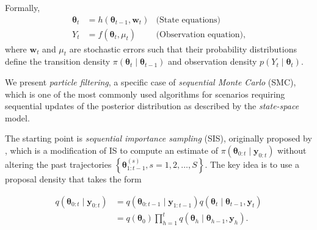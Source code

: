 Formally,
\begin{align*}
	\bm{\theta}_t &= h(\bm{\theta}_{t-1}, \bm{w}_t) & \text{(State equations)}\nonumber\\
	Y_t & = f(\bm{\theta}_t, \mu_t)& \text{(Observation equation)},
\end{align*}
where $\bm{w}_t$ and $\mu_t$ are stochastic errors such that their probability distributions define the transition density $\pi(\bm{\theta}_t\mid \bm{\theta}_{t-1})$ and observation density $p(Y_t\mid \bm{\theta}_t)$. 

We present \textit{particle filtering}, a specific case of \textit{sequential Monte Carlo} (SMC), which is one of the most commonly used algorithms for scenarios requiring sequential updates of the posterior distribution as described by the \textit{state-space} model.

The starting point is \textit{sequential importance sampling} (SIS), originally proposed by \cite{handschin1969monte}, which is a modification of IS to compute an estimate of $\pi(\bm{\theta}_{0:t}\mid \bm{y}_{0:t})$ without altering the past trajectories $\left\{\bm{\theta}^{(s)}_{1:t-1}, s=1,2,\dots,S\right\}$. The key idea is to use a proposal density that takes the form

\begin{align*}
	q(\bm{\theta}_{0:t}\mid \bm{y}_{0:t}) &= q(\bm{\theta}_{0:t-1}\mid \bm{y}_{1:t-1})q(\bm{\theta}_t\mid \bm{\theta}_{t-1},\bm{y}_{t}) \\
	&= q(\bm{\theta}_0)\prod_{h=1}^{t}q(\bm{\theta}_h\mid \bm{\theta}_{h-1},\bm{y}_{h}).
\end{align*}

